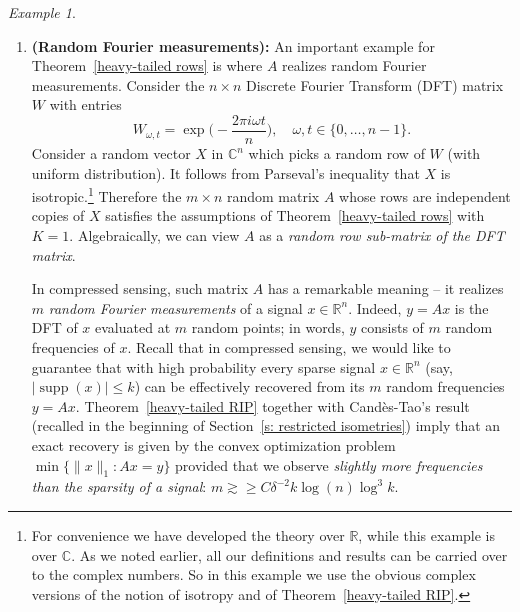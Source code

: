 \documentclass[10pt, openany]{book}
\theoremstyle{remark}
\newtheorem{example}[theorem]{Example}
\DeclareMathOperator{\supp}{supp}
\def \R {\mathbb{R}}
\def \C {\mathbb{C}}
\def \d {\delta}
\begin{document}
\begin{example}								\label{random measurements}
\begin{enumerate}
  \item {\bf (Random Fourier measurements):} 
    An important example for Theorem~\ref{heavy-tailed rows} 
    is where $A$ realizes random Fourier measurements. 
    Consider the $n \times n$ Discrete Fourier Transform (DFT) matrix $W$ with entries 
    $$
    W_{\omega,t} = \exp \Big( -\frac{2 \pi i \omega t}{n} \Big), 
    \quad \omega, t \in \{0,\ldots,n-1\}.
    $$
    Consider a random vector $X$ in $\C^n$ which picks a random row of $W$ (with uniform distribution).
    It follows from Parseval's inequality that $X$ is isotropic.\footnote{For convenience we have developed the theory over $\R$,
    while this example is over $\C$. As we noted earlier, all our definitions and results can be carried
    over to the complex numbers. So in this example we use the obvious complex versions of the notion of isotropy and 
    of Theorem~\ref{heavy-tailed RIP}.}
    Therefore the $m \times n$ random matrix $A$ whose rows are independent copies of $X$ 
    satisfies the assumptions of Theorem~\ref{heavy-tailed rows} with $K=1$.
    Algebraically, we can view $A$ as a {\em random row sub-matrix of the DFT matrix}.
    
    In compressed sensing, such matrix $A$ has a remarkable meaning -- it realizes 
    $m$ {\em random Fourier measurements} of a signal $x \in \R^n$. Indeed, $y=Ax$ is the DFT
    of $x$ evaluated at $m$ random points; in words, $y$ consists of $m$ random frequencies of $x$. 
    Recall that in compressed sensing, we would like to guarantee that with high probability 
    every sparse signal $x \in \R^n$ (say, $|\supp(x)| \le k$) 
    can be effectively recovered from its $m$ random frequencies $y=Ax$.
    Theorem~\ref{heavy-tailed RIP} together with Cand\`es-Tao's result (recalled in the beginning of 
    Section~\ref{s: restricted isometries}) imply that an exact recovery is given by the convex 
    optimization problem $\min\{ \|x\|_1 : Ax=y\}$ provided that we observe {\em slightly more frequencies 
    than the sparsity of a signal}: $m \gtrsim \ge C \d^{-2} k \log (n) \log^{3} k$.
    

\end{enumerate}
\end{example}
\end{document}
